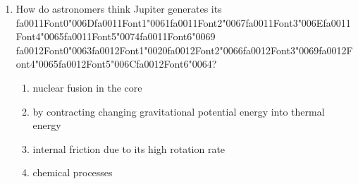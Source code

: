 \documentclass[12pt]{article}
\begin{document}
\begin{enumerate}[label=\arabic*.]
\begin{enumerate}[label=(\alph*)]
    \item Mass 5kg weight 100N
    \item Mass 5kg weight 50N
    \item Mass 5kg weight 25N
    \item Mass 10kg weight 100N
\end{enumerate}
\item How do astronomers think Jupiter generates its {\csname fa0011Font0\endcsname\char"006D}{\csname fa0011Font1\endcsname\char"0061}{\csname fa0011Font2\endcsname\char"0067}{\csname fa0011Font3\endcsname\char"006E}{\csname fa0011Font4\endcsname\char"0065}{\csname fa0011Font5\endcsname\char"0074}{\csname fa0011Font6\endcsname\char"0069} {\csname fa0012Font0\endcsname\char"0063}{\csname fa0012Font1\endcsname\char"0020}{\csname fa0012Font2\endcsname\char"0066}{\csname fa0012Font3\endcsname\char"0069}{\csname fa0012Font4\endcsname\char"0065}{\csname fa0012Font5\endcsname\char"006C}{\csname fa0012Font6\endcsname\char"0064}?
\begin{enumerate}[label=(\alph*)]
    \item nuclear fusion in the core
    \item by contracting changing gravitational potential energy into thermal energy
    \item internal friction due to its high rotation rate
    \item chemical processes
\end{enumerate}
\end{enumerate}
\end{document}
